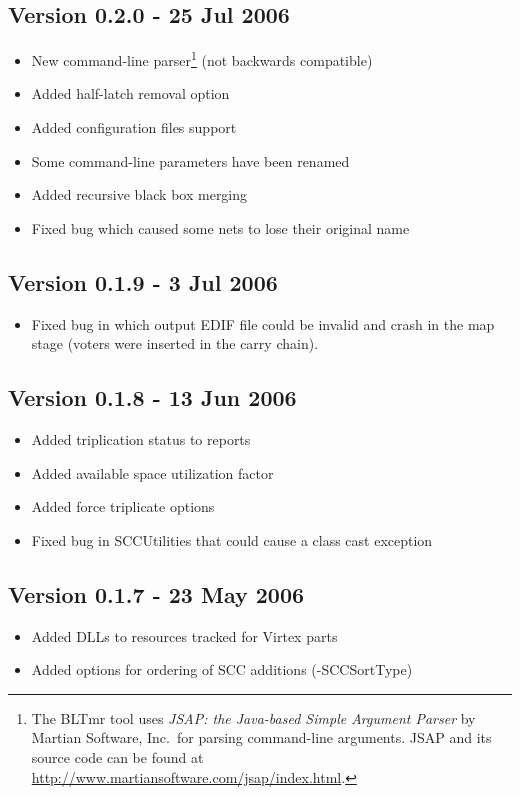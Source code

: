 \documentclass[english]{article}
\begin{document}
\subsection*{Version 0.2.0 - 25 Jul 2006}
\begin{itemize}
\item New command-line parser\footnote{The BLTmr tool uses \emph{JSAP: the 
Java-based Simple Argument Parser} by Martian Software, Inc.\ for parsing 
command-line arguments.  JSAP and its source code can be found at 
\url{http://www.martiansoftware.com/jsap/index.html}.} (not backwards 
compatible)
\item Added half-latch removal option
\item Added configuration files support
\item Some command-line parameters have been renamed
\item Added recursive black box merging
\item Fixed bug which caused some nets to lose their original name
\end{itemize}

\subsection*{Version 0.1.9 - 3 Jul 2006}
\begin{itemize}
\item Fixed bug in which output EDIF file could be invalid and crash in the map 
stage (voters were inserted in the carry chain).
\end{itemize}

\subsection*{Version 0.1.8 - 13 Jun 2006}
\begin{itemize}
\item Added triplication status to reports
\item Added available space utilization factor
\item Added force triplicate options
\item Fixed bug in SCCUtilities that could cause a class cast exception
\end{itemize}

\subsection*{Version 0.1.7 - 23 May 2006}
\begin{itemize}
\item Added DLLs to resources tracked for Virtex parts
\item Added options for ordering of SCC additions (-SCCSortType)
\end{itemize}
\end{document}
